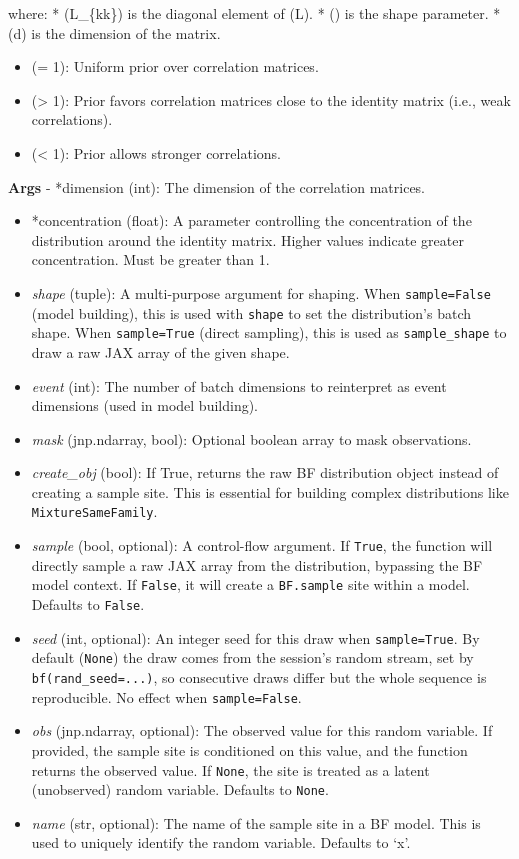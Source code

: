 \documentclass[
  letterpaper,
  DIV=11,
  numbers=noendperiod]{scrartcl}
\providecommand{\tightlist}{%
  \setlength{\itemsep}{0pt}\setlength{\parskip}{0pt}}\usepackage{longtable,booktabs,array}
\begin{document}
where: * (L\_\{kk\}) is the diagonal element of (L). * (\eta) is the
shape parameter. * (d) is the dimension of the matrix.

\begin{itemize}
\tightlist
\item
  (\eta = 1): Uniform prior over correlation matrices.
\item
  (\eta \textgreater{} 1): Prior favors correlation matrices close to
  the identity matrix (i.e., weak correlations).
\item
  (\eta \textless{} 1): Prior allows stronger correlations.
\end{itemize}

\textbf{Args} - *dimension (int): The dimension of the correlation
matrices.

\begin{itemize}
\item
  *concentration (float): A parameter controlling the concentration of
  the distribution around the identity matrix. Higher values indicate
  greater concentration. Must be greater than 1.
\item
  \emph{shape} (tuple): A multi-purpose argument for shaping. When
  \texttt{sample=False} (model building), this is used with
  \texttt{shape} to set the distribution's batch shape. When
  \texttt{sample=True} (direct sampling), this is used as
  \texttt{sample\_shape} to draw a raw JAX array of the given shape.
\item
  \emph{event} (int): The number of batch dimensions to reinterpret as
  event dimensions (used in model building).
\item
  \emph{mask} (jnp.ndarray, bool): Optional boolean array to mask
  observations.
\item
  \emph{create\_obj} (bool): If True, returns the raw BF distribution
  object instead of creating a sample site. This is essential for
  building complex distributions like \texttt{MixtureSameFamily}.
\item
  \emph{sample} (bool, optional): A control-flow argument. If
  \texttt{True}, the function will directly sample a raw JAX array from
  the distribution, bypassing the BF model context. If \texttt{False},
  it will create a \texttt{BF.sample} site within a model. Defaults to
  \texttt{False}.
\item
  \emph{seed} (int, optional): An integer seed for this draw when
  \texttt{sample=True}. By default (\texttt{None}) the draw comes from
  the session's random stream, set by \texttt{bf(rand\_seed=...)}, so
  consecutive draws differ but the whole sequence is reproducible. No
  effect when \texttt{sample=False}.
\item
  \emph{obs} (jnp.ndarray, optional): The observed value for this random
  variable. If provided, the sample site is conditioned on this value,
  and the function returns the observed value. If \texttt{None}, the
  site is treated as a latent (unobserved) random variable. Defaults to
  \texttt{None}.
\item
  \emph{name} (str, optional): The name of the sample site in a BF
  model. This is used to uniquely identify the random variable. Defaults
  to `x'.


\end{itemize}
\end{document}

